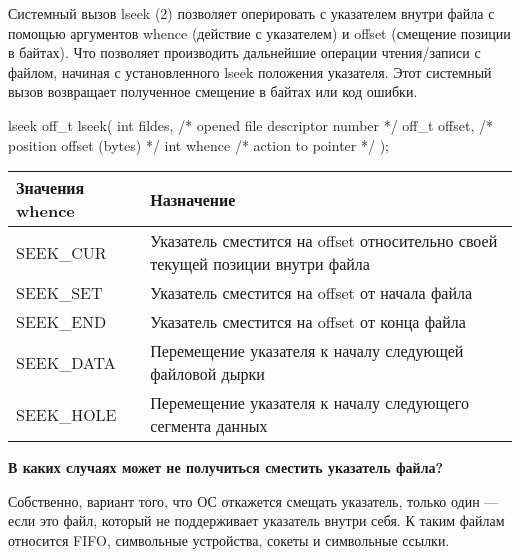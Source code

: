 Системный вызов lseek (2) позволяет оперировать с указателем внутри файла с помощью аргументов whence (действие с указателем) и offset (смещение позиции в байтах). Что позволяет производить дальнейшие операции чтения/записи с файлом, начиная с установленного lseek положения указателя. Этот системный вызов возвращает полученное смещение в байтах или код ошибки.

\begin{CCode}{lseek}
	off_t lseek( 
		int fildes,	 		/* opened file descriptor number */ 
		off_t offset, 		/* position offset (bytes) */ 
		int whence 	 		/* action to pointer */ 
); \end{CCode}

\begin{center}
\begin{tabular}{l|p{10cm}}
	\textbf{Значения whence}	&	\textbf{Назначение} \\
	\hline
	SEEK\_CUR	&	Указатель сместится на offset относительно своей текущей позиции внутри файла \\
	\hline
	SEEK\_SET	&	Указатель сместится на offset от начала файла \\
	\hline
	SEEK\_END	&	Указатель сместится на offset от конца файла \\
	\hline
	SEEK\_DATA	&	Перемещение указателя к началу следующей файловой дырки \\
	\hline	
	SEEK\_HOLE	&	Перемещение указателя к началу следующего сегмента данных
\end{tabular}
\end{center}

\textbf{В каких случаях может не получиться сместить указатель файла?}

Собственно, вариант того, что ОС откажется смещать указатель, только один --- если это файл, который не поддерживает указатель внутри себя. К таким файлам относится FIFO, символьные устройства, сокеты и символьные ссылки. 
